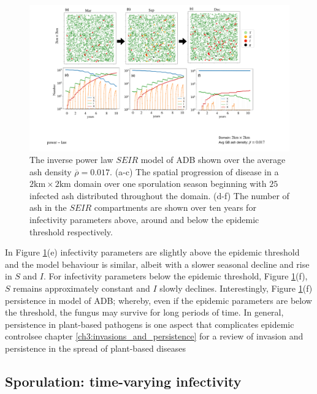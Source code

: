 \begin{landscape}
\begin{figure}
    \centering
    \includegraphics[scale=0.45]{chapter6/figures/fig4-seir.pdf}
     \caption{The inverse power law $SEIR$ model of ADB shown over the average ash density $\overline{\rho} = 0.017$. (a-c) The spatial progression of disease in a $2\mathrm{km} \times 2\mathrm{km}$ domain over one sporulation season beginning with $25$ infected ash distributed throughout the domain. (d-f) The number of ash in the $SEIR$ compartments are shown over ten years for infectivity parameters above, around and below the epidemic threshold respectively.}
    \label{fig:SEIR-spread}
\end{figure}
\end{landscape}

In Figure \ref{fig:SEIR-spread}(e) infectivity parameters are slightly above the epidemic threshold and the model behaviour is similar, albeit with a slower seasonal decline and rise in $S$ and $I$. For infectivity parameters below the epidemic threshold, Figure \ref{fig:SEIR-spread}(f), $S$ remains approximately constant and $I$ slowly declines. Interestingly, Figure \ref{fig:SEIR-spread}(f) persistence in model of ADB; whereby, even if the epidemic parameters are below the threshold, the fungus may survive for long periods of time. In general, persistence in plant-based pathogens is one aspect that complicates epidemic control\textemdash see chapter \ref{ch3:invasions_and_persistence} for a review of invasion and persistence in the spread of plant-based diseases

\subsection{Sporulation: time-varying infectivity}
\label{ch6:sporulation}


